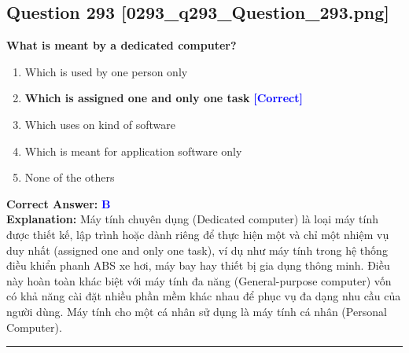 \documentclass[11pt,a4paper]{article}
\begin{document}
\begin{minipage}{\textwidth}
\subsection*{Question 293 \quad \footnotesize{[0293\_q293\_Question\_293.png]}}
\noindent \textbf{What is meant by a dedicated computer?}

\begin{enumerate}[label=\Alph*.]
    \item Which is used by one person only
    \item \textbf{Which is assigned one and only one task} \hfill \textcolor{blue}{\textbf{[Correct]}}
    \item Which uses on kind of software
    \item Which is meant for application software only
    \item None of the others
\end{enumerate}

\noindent \textbf{Correct Answer:} \textcolor{blue}{\textbf{B}} \\[2pt]
\noindent \textbf{Explanation:} Máy tính chuyên dụng (Dedicated computer) là loại máy tính được thiết kế, lập trình hoặc dành riêng để thực hiện một và chỉ một nhiệm vụ duy nhất (assigned one and only one task), ví dụ như máy tính trong hệ thống điều khiển phanh ABS xe hơi, máy bay hay thiết bị gia dụng thông minh. Điều này hoàn toàn khác biệt với máy tính đa năng (General-purpose computer) vốn có khả năng cài đặt nhiều phần mềm khác nhau để phục vụ đa dạng nhu cầu của người dùng. Máy tính cho một cá nhân sử dụng là máy tính cá nhân (Personal Computer).

\par\vspace{0.3cm}
\hrule
\vspace{0.3cm}
\end{minipage}
\end{document}
